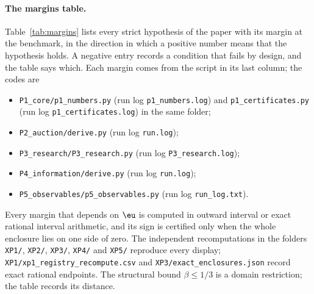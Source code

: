 \paragraph{The margins table.}
Table~\ref{tab:margins} lists every strict hypothesis of the paper with its margin at the benchmark, in the
direction in which a positive number means that the hypothesis holds. A negative entry records a condition that
fails by design, and the table says which. Each margin comes from the script in its last column; the codes are
\begin{itemize}[leftmargin=2em,itemsep=0pt]
\item[{[P1]}] \nolinkurl{P1_core/p1_numbers.py} (run log
\nolinkurl{p1_numbers.log}) and \nolinkurl{p1_certificates.py} (run log \nolinkurl{p1_certificates.log}) in the same
folder;
\item[{[P2]}] \nolinkurl{P2_auction/derive.py} (run log \nolinkurl{run.log});
\item[{[P3]}] \nolinkurl{P3_research/P3_research.py} (run log
\nolinkurl{P3_research.log});
\item[{[P4]}] \nolinkurl{P4_information/derive.py} (run log \nolinkurl{run.log});
\item[{[P5]}] \nolinkurl{P5_observables/p5_observables.py} (run log
\nolinkurl{run_log.txt}).
\end{itemize}
Every margin that depends on \(\eu\) is computed in outward interval or exact rational interval arithmetic, and its
sign is certified only when the whole enclosure lies on one side of zero. The independent recomputations in the folders
\nolinkurl{XP1/}, \nolinkurl{XP2/}, \nolinkurl{XP3/}, \nolinkurl{XP4/} and \nolinkurl{XP5/} reproduce every display; \nolinkurl{XP1/xp1_registry_recompute.csv} and
\nolinkurl{XP3/exact_enclosures.json} record exact rational endpoints. The structural bound \(\beta\le1/3\) is a domain
restriction; the table records its distance.

